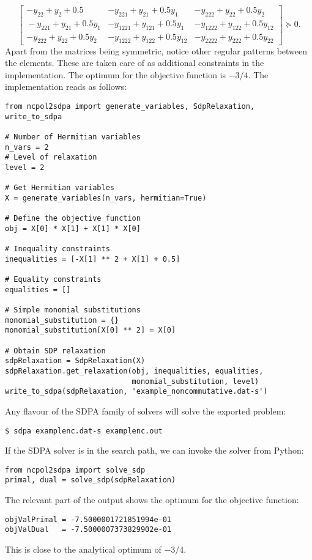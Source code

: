 \documentclass{article}
\begin{document}
\[
\left[ \begin{array}{c|cc}
-y_{22}+y_{2}+0.5 & -y_{221}+y_{21}+0.5y_{1} & -y_{222}+y_{22}+0.5y_{2}\\
\hline{}
-y_{221}+y_{21}+0.5y_{1} & -y_{1221}+y_{121}+0.5y_{1} & -y_{1222}+y_{122}+0.5y_{12}\\
-y_{222}+y_{22}+0.5y_{2} & -y_{1222}+y_{122}+0.5y_{12} & -y_{2222}+y_{222}+0.5y_{22}
\end{array}\right]\succeq{}0.
\]
Apart from the matrices being symmetric, notice other regular patterns between the elements. These are taken care of as additional constraints in the implementation. The optimum for the objective function is $-3/4$. The implementation reads as follows:
\begin{verbatim}
from ncpol2sdpa import generate_variables, SdpRelaxation, write_to_sdpa

# Number of Hermitian variables
n_vars = 2
# Level of relaxation
level = 2

# Get Hermitian variables
X = generate_variables(n_vars, hermitian=True)

# Define the objective function
obj = X[0] * X[1] + X[1] * X[0]

# Inequality constraints
inequalities = [-X[1] ** 2 + X[1] + 0.5]

# Equality constraints
equalities = []

# Simple monomial substitutions
monomial_substitution = {}
monomial_substitution[X[0] ** 2] = X[0]

# Obtain SDP relaxation
sdpRelaxation = SdpRelaxation(X)
sdpRelaxation.get_relaxation(obj, inequalities, equalities,
                             monomial_substitution, level)
write_to_sdpa(sdpRelaxation, 'example_noncommutative.dat-s')
\end{verbatim}

Any flavour of the SDPA family of solvers will solve the exported problem:
\begin{verbatim}
$ sdpa examplenc.dat-s examplenc.out
\end{verbatim}

If the SDPA solver is in the search path, we can invoke the solver from Python:
\begin{verbatim}
from ncpol2sdpa import solve_sdp
primal, dual = solve_sdp(sdpRelaxation)
\end{verbatim}

The relevant part of the output shows the optimum for the objective function:
\begin{verbatim}
objValPrimal = -7.5000001721851994e-01
objValDual   = -7.5000007373829902e-01
\end{verbatim}
This is close to the analytical optimum of $-3/4$.
\end{document}
